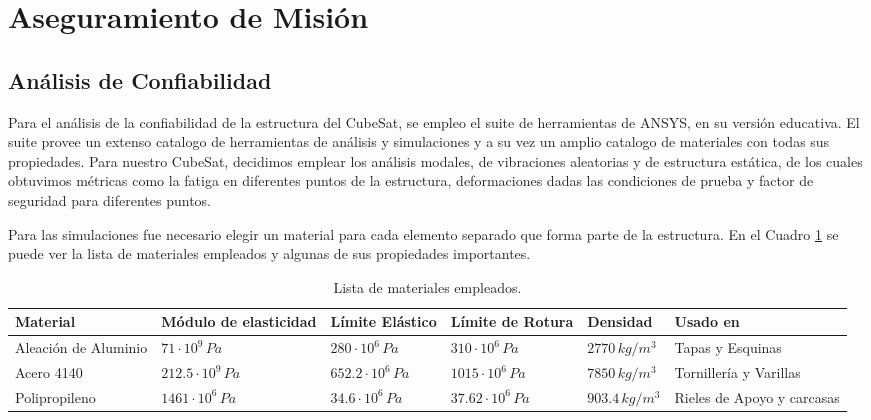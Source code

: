\section{Aseguramiento de Misión}

  \subsection{Análisis de Confiabilidad}
    Para el análisis de la confiabilidad de la estructura del CubeSat, se empleo el suite de herramientas de ANSYS, en
    su versión educativa. El suite provee un extenso catalogo de herramientas de análisis y simulaciones y a su vez un
    amplio catalogo de materiales con todas sus propiedades. Para nuestro CubeSat, decidimos emplear los análisis
    modales, de vibraciones aleatorias y de estructura estática, de los cuales obtuvimos métricas como la fatiga en
    diferentes puntos de la estructura, deformaciones dadas las condiciones de prueba y factor de seguridad para
    diferentes puntos.

    Para las simulaciones fue necesario elegir un material para cada elemento separado que forma parte de la estructura.
    En el Cuadro \ref{tab:materiales_empleados} se puede ver la lista de materiales empleados y algunas de sus
    propiedades importantes.

    \begin{table}[H]
    \centering
    \small
    \begin{tabular}{|p{2.2cm}|p{2.3cm}|p{2.3cm}|p{2.5cm}|p{2cm}|p{2.5cm}|}
    \hline
    \textbf{Material} & \centering\textbf{Módulo de elasticidad} & \centering\textbf{Límite Elástico} & \centering\textbf{Límite de Rotura} & \centering\textbf{Densidad} & \centering\textbf{Usado en} \tabularnewline
    \hline
    Aleación de Aluminio & \centering $71 \cdot 10^9\,Pa$ & \centering $280 \cdot 10^6\,Pa$ & \centering $310 \cdot 10^6\,Pa$ & \centering $2770\,kg/m^3$ & Tapas y Esquinas \tabularnewline
    \hline
    Acero 4140 & \centering $212.5 \cdot 10^9\,Pa$ & \centering $652.2 \cdot 10^6\,Pa$ & \centering $1015 \cdot 10^6\,Pa$ & \centering $7850\,kg/m^3$ & Tornillería y Varillas \tabularnewline
    \hline
    Polipropileno & \centering $1461 \cdot 10^6\,Pa$ & \centering $34.6 \cdot 10^6\,Pa$ & \centering $37.62 \cdot 10^6\,Pa$ & \centering $903.4\,kg/m^3$ & Rieles de Apoyo y carcasas \tabularnewline
    \hline
    \end{tabular}
    \caption{Lista de materiales empleados.}
    \label{tab:materiales_empleados}
    \end{table}

